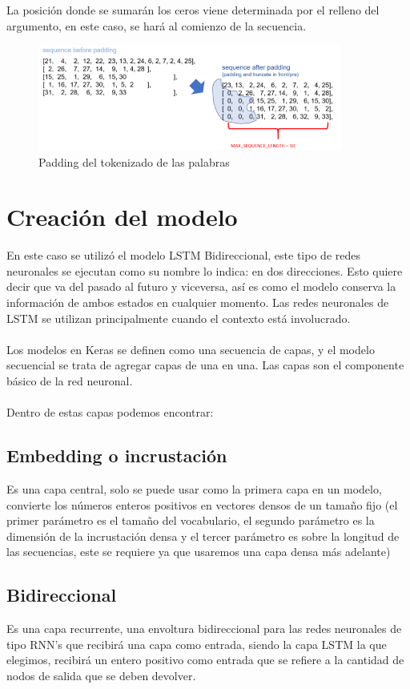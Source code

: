 \documentclass[12pt, a4paper, titlepage]{report}
\begin{document}
La posición donde se sumarán los ceros viene determinada por el relleno del argumento, en este caso, se hará al comienzo de la secuencia.
\begin{figure}[H]
	\includegraphics[width=10cm]{./imagenes/Desarrollo/Kaggle/padding.png}
	\centering 
	\caption{Padding del tokenizado de las palabras}
\end{figure}	
\newpage	
\section{Creación del modelo}
En este caso se utilizó el modelo LSTM Bidireccional, este tipo de redes neuronales se ejecutan como su nombre lo indica: en dos direcciones. Esto quiere decir que va del pasado al futuro y viceversa, así es como el modelo conserva la información de ambos estados en cualquier momento. Las redes neuronales de LSTM se utilizan principalmente cuando el contexto está involucrado.\\\\
Los modelos en Keras se definen como una secuencia de capas, y el modelo secuencial se trata de agregar capas de una en una. Las capas son el componente básico de la red neuronal.\\\\
Dentro de estas capas podemos encontrar:
\subsection{Embedding o incrustación}
Es una capa central, solo se puede usar como la primera capa en un modelo, convierte los números enteros positivos en vectores densos de un tamaño fijo (el primer parámetro es el tamaño del vocabulario, el segundo parámetro es la dimensión de la incrustación densa y el tercer parámetro es sobre la longitud de las secuencias, este se requiere ya que usaremos una capa densa más adelante)
\begin{center}
	
\end{center}
\subsection{Bidireccional}
Es una capa recurrente, una envoltura bidireccional para las redes neuronales de tipo RNN's que recibirá una capa como entrada, siendo la capa LSTM la que elegimos, recibirá un entero positivo como entrada que se refiere a la cantidad de nodos de salida que se deben devolver.
\begin{center}
	
\end{center}
\end{document}
